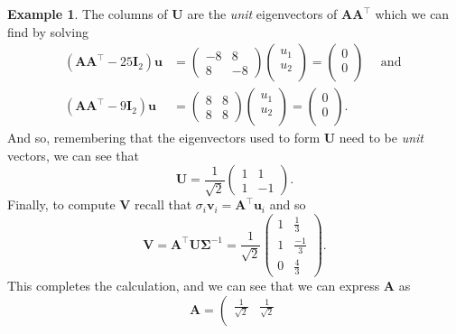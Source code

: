 \documentclass[]{book}
\theoremstyle{definition}
\theoremstyle{definition}
\newtheorem{example}{Example}[chapter]
\theoremstyle{definition}
\theoremstyle{remark}
\begin{document}
\begin{example}
The columns of \(\mathbf U\) are the \emph{unit} eigenvectors of \(\mathbf A\mathbf A^\top\) which we can find by solving
\begin{align*}(\mathbf A\mathbf A^\top-25\mathbf I_2)\mathbf u&=\left(\begin{array}{cc}-8&8\\
               8&-8\end{array}\right)\left(\begin{array}{c}u_1\\u_2\\\end{array}\right)=\left(\begin{array}{c}0\\0\\\end{array}\right) \quad \mbox{ and }\\ (\mathbf A\mathbf A^\top-9\mathbf I_2)\mathbf u&=\left(\begin{array}{cc}8&8\\
               8&8\end{array}\right)\left(\begin{array}{c}u_1\\u_2\\\end{array}\right)=\left(\begin{array}{c}0\\0\\\end{array}\right).\end{align*}
And so, remembering that the eigenvectors used to form \(\mathbf U\) need to be \emph{unit} vectors, we can see that
\[\mathbf U=\frac{1}{\sqrt{2}}\left(\begin{array}{cc}1&1\\
               1&-1\end{array}\right).\]
Finally, to compute \(\mathbf V\) recall that \(\sigma_i \mathbf v_i = \mathbf A^\top \mathbf u_i\) and so
\[\mathbf V= \mathbf A^\top\mathbf U\boldsymbol{\Sigma}^{-1} = \frac{1}{\sqrt{2}}\left(\begin{array}{cc}1&\frac{1}{3}\\
                                                           1&\frac{-1}{3}\\
                                                           0&\frac{4}{3}\end{array}\right).
\]
This completes the calculation, and we can see that we can express \(\mathbf A\) as
\[\mathbf A= \left(\begin{array}{cc}\frac{1}{\sqrt{2}}&\frac{1}{\sqrt{2}}\\

\end{array}\]
\end{example}
\end{document}
